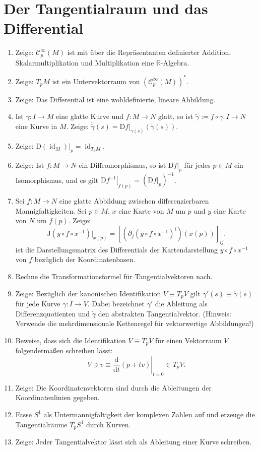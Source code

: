 \documentclass[a4paper]{scrartcl}
\newcommand{\D}{\mathrm{d}}
\newcommand{\DD}{\mathrm{D}}
\DeclareMathOperator{\id}{id}
\newcommand{\sC}{\mathcal{C}^{\infty}}
\begin{document}
	\section{Der Tangentialraum und das Differential}
	\begin{enumerate}
		\item Zeige: $\sC_p(M)$ ist mit über die Repräsentanten definierter Addition, Skalarmultiplikation und Multiplikation eine $\mathbb R$-Algebra.
		\item Zeige: $T_pM$ ist ein Untervektorraum von $(\sC_p(M))^*$.
		\item Zeige: Das Differential ist eine wohldefinierte, lineare Abbildung.
		\item Ist $\gamma\colon I \to M$ eine glatte Kurve und $f\colon M \to N$ glatt, so ist $\tilde\gamma := f\circ\gamma \colon I \to N$ eine Kurve in $M$. Zeige: $\dot{\tilde\gamma}(s) = \left.\DD f\right|_{\gamma(s)} (\dot\gamma(s))$.
		\item Zeige: $\left.\DD(\id_M)\right|_p = \id_{T_pM}$.
		\item Zeige: Ist $f\colon M \to N$ ein Diffeomorphismus, so ist $\left.\DD f\right|_p$ für jedes $p\in M$ ein Isomorphismus, und es gilt $\left.\DD f^{-1}\right|_{f(p)} = \left(\left.\DD f\right|_p\right)^{-1}$.
		\item Sei $f\colon M \to N$ eine glatte Abbildung zwischen differenzierbaren Mannigfaltigkeiten. Sei $p\in M$, $x$ eine Karte von $M$ um $p$ und $y$ eine Karte von $N$ um $f(p)$. Zeige: \[\mathrm{J}(y\circ f\circ x^{-1})|_{x(p)} = \left[\left(\partial_j(y\circ f\circ x^{-1})^i\right) (x(p)) \right]_{ij}.\]
		ist die Darstellungsmatrix des Differentials der Kartendarstellung $y\circ f\circ x^{-1}$ von $f$ bezüglich der Koordinatenbasen.
		\item Rechne die Transformationsformel für Tangentialvektoren nach.
		\item Zeige: Bezüglich der kanonischen Identifikation $V\equiv T_pV$ gilt $\gamma'(s) \equiv \dot\gamma(s)$ für jede Kurve $\gamma\colon I\rightarrow V$. Dabei bezeichnet $\gamma'$ die Ableitung als Differenzquotienten und $\dot{\gamma}$ den abstrakten Tangentialvektor. (Hinweis: Verwende die mehrdimensionale Kettenregel für vektorwertige Abbildungen!)
		\item Beweise, dass sich die Identifikation $V\equiv T_pV$ für einen Vektorraum $V$ folgendermaßen schreiben lässt: 
		\[V \ni v \equiv \left.\frac{\D}{\D t}(p + tv)\right|_{t=0} \in T_pV.\]
		\item Zeige: Die Koordinatenvektoren sind durch die Ableitungen der Koordinatenlinien gegeben.
		\item Fasse $S^1$ als Untermannigfaltigkeit der komplexen Zahlen auf und erzeuge die Tangentialräume $T_pS^1$ durch Kurven.
		\item Zeige: Jeder Tangentialvektor lässt sich als Ableitung einer Kurve schreiben.
	\end{enumerate}
\end{document}
